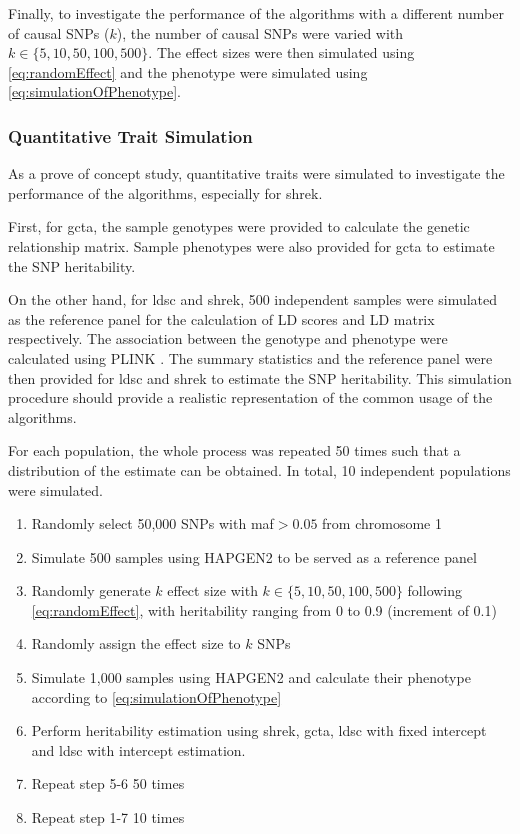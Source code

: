 \documentclass[12pt]{scrbook}
\begin{document}
Finally, to investigate the performance of the algorithms with a different number of causal \glspl{SNP} ($k$), the number of causal \glspl{SNP} were varied with $k\in\{5, 10, 50, 100, 500\}$.
The effect sizes were then simulated using \cref{eq:randomEffect} and the phenotype were simulated using \cref{eq:simulationOfPhenotype}.

\subsubsection{Quantitative Trait Simulation}
As a prove of concept study, quantitative traits were simulated to investigate the performance of the algorithms, especially for \gls{shrek}.

First, for \gls{gcta}, the sample genotypes were provided to calculate the genetic relationship matrix. 
Sample phenotypes were also provided for \gls{gcta} to estimate the \gls{SNP} heritability.

On the other hand, for \gls{ldsc} and \gls{shrek}, 500 independent samples were simulated as the reference panel for the calculation of \gls{LD} scores and \gls{LD} matrix respectively. 
The association between the genotype and phenotype were calculated using PLINK \citep{Purcell2007}.
The summary statistics and the reference panel were then provided for \gls{ldsc} and \gls{shrek} to estimate the \gls{SNP} heritability.
This simulation procedure should provide a realistic representation of the common usage of the algorithms.

For each population, the whole process was repeated 50 times such that a distribution of the estimate can be obtained. 
In total, 10 independent populations were simulated.
\begin{enumerate}
	\item Randomly select 50,000 \glspl{SNP} with \gls{maf}$>0.05$ from chromosome 1
	\item Simulate 500 samples using HAPGEN2 to be served as a reference panel
	\item Randomly generate $k$ effect size with $k \in \{5,10,50,100,500\}$ following \cref{eq:randomEffect}, with heritability ranging from 0 to 0.9 (increment of 0.1)
	\item Randomly assign the effect size to $k$ \glspl{SNP}
	\item Simulate 1,000 samples using HAPGEN2 and calculate their phenotype according to \cref{eq:simulationOfPhenotype}
	\item Perform heritability estimation using \gls{shrek}, \gls{gcta}, \gls{ldsc} with fixed intercept and \gls{ldsc} with intercept estimation.
	\item Repeat step 5-6 50 times
	\item Repeat step 1-7 10 times
\end{enumerate}
\end{document}
